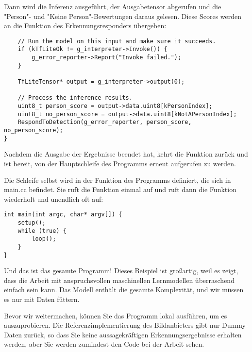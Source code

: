 Dann wird die Inferenz ausgeführt, der Ausgabetensor abgerufen und die "Person"- und "Keine Person"-Bewertungen daraus gelesen. Diese Scores werden an die Funktion  des Erkennungsresponders übergeben:
    
\begin{code}
    \begin{lstlisting}
    // Run the model on this input and make sure it succeeds.
    if (kTfLiteOk != g_interpreter->Invoke()) {
        g_error_reporter->Report("Invoke failed.");
    }
    
    TfLiteTensor* output = g_interpreter->output(0);
    
    // Process the inference results.
    uint8_t person_score = output->data.uint8[kPersonIndex];
    uint8_t no_person_score = output->data.uint8[kNotAPersonIndex];
    RespondToDetection(g_error_reporter, person_score, no_person_score);
}
  \end{lstlisting}
\end{code}

Nachdem  die Ausgabe der Ergebnisse beendet hat, kehrt die Funktion  zurück und ist bereit, von der Hauptschleife des Programms erneut aufgerufen zu werden.

Die Schleife selbst wird in der Funktion  des Programms definiert, die sich in main.cc befindet. Sie ruft die Funktion  einmal auf und ruft dann die Funktion  wiederholt und unendlich oft auf:

\begin{code}
    \begin{lstlisting}
int main(int argc, char* argv[]) {
    setup();
    while (true) {
        loop();
    }
}
  \end{lstlisting}
\end{code}

Und das ist das gesamte Programm! Dieses Beispiel ist großartig, weil es zeigt, dass die Arbeit mit anspruchsvollen maschinellen Lernmodellen überraschend einfach sein kann. Das Modell enthält die gesamte Komplexität, und wir müssen es nur mit Daten füttern.

Bevor wir weitermachen, können Sie das Programm lokal ausführen, um es auszuprobieren. Die Referenzimplementierung des Bildanbieters gibt nur Dummy-Daten zurück, so dass Sie keine aussagekräftigen Erkennungsergebnisse erhalten werden, aber Sie werden zumindest den Code bei der Arbeit sehen.

